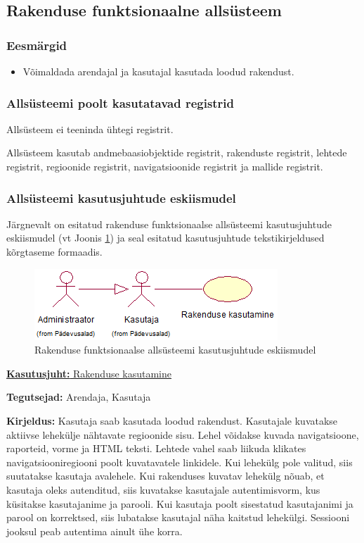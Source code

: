 \documentclass[a4paper,12pt]{article} %
\begin{document}
\subsection{Rakenduse funktsionaalne allsüsteem}
\subsubsection{Eesmärgid}
\begin{itemize}
\item Võimaldada arendajal ja kasutajal kasutada loodud rakendust.
\end{itemize}
\subsubsection{Allsüsteemi poolt kasutatavad registrid}
Allsüsteem ei teeninda ühtegi registrit.\par
Allsüsteem kasutab andmebaasiobjektide registrit, rakenduste registrit, lehtede registrit, regioonide registrit, navigatsioonide registrit ja mallide registrit.
\subsubsection{Allsüsteemi kasutusjuhtude eskiismudel}
Järgnevalt on esitatud rakenduse funktsionaalse allsüsteemi kasutusjuhtude eskiismudel (vt Joonis \ref{fig_rakenduse_funktsionaalse_allsüsteemi_kasutusjuhtude_eskiismudel}) ja seal esitatud kasutusjuhtude tekstikirjeldused kõrgtaseme formaadis.
\begin{figure}[H]
\begin{center}
\includegraphics[bb=0 0 346 101,scale=1]{./diagrams/application-subsystem-use-case-digram.png}
\caption{Rakenduse funktsionaalse allsüsteemi kasutusjuhtude eskiismudel}
\label{fig_rakenduse_funktsionaalse_allsüsteemi_kasutusjuhtude_eskiismudel}
\end{center}
\end{figure}

\underline{\textbf{Kasutusjuht:} Rakenduse kasutamine}
\par
\textbf{Tegutsejad:} Arendaja, Kasutaja
\par
\textbf{Kirjeldus:} Kasutaja saab kasutada loodud rakendust. Kasutajale kuvatakse aktiivse lehekülje nähtavate regioonide sisu. Lehel võidakse kuvada navigatsioone, raporteid, vorme ja HTML teksti. Lehtede vahel saab liikuda klikates navigatsiooniregiooni poolt kuvatavatele linkidele. Kui lehekülg pole valitud, siis suutatakse kasutaja avalehele. Kui rakenduses kuvatav lehekülg nõuab, et kasutaja oleks autenditud, siis kuvatakse kasutajale autentimisvorm, kus küsitakse kasutajanime ja parooli. Kui kasutaja poolt sisestatud kasutajanimi ja parool on korrektsed, siis lubatakse kasutajal näha kaitstud lehekülgi. Sessiooni jooksul peab autentima ainult ühe korra.
\par
\end{document}
